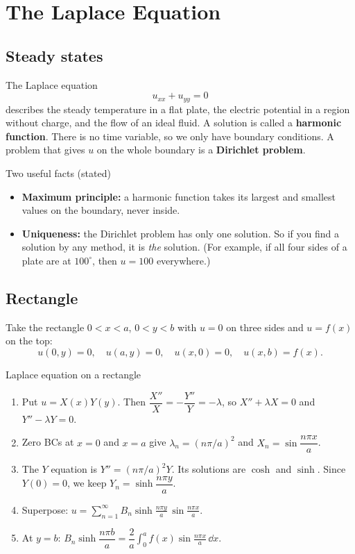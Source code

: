 \chapter{The Laplace Equation}

\section{Steady states}

The Laplace equation
\[ u_{xx} + u_{yy} = 0 \]
describes the steady temperature in a flat plate, the electric potential in a region without charge, and the flow of an ideal fluid. A solution is called a \textbf{harmonic function}. There is no time variable, so we only have boundary conditions. A problem that gives $u$ on the whole boundary is a \textbf{Dirichlet problem}.

\begin{defbox}{Two useful facts (stated)}
\begin{itemize}
  \item \textbf{Maximum principle:} a harmonic function takes its largest and smallest values on the boundary, never inside.
  \item \textbf{Uniqueness:} the Dirichlet problem has only one solution. So if you find a solution by any method, it is \emph{the} solution. (For example, if all four sides of a plate are at $100^\circ$, then $u=100$ everywhere.)
\end{itemize}
\end{defbox}

\section{Rectangle}

Take the rectangle $0<x<a$, $0<y<b$ with $u=0$ on three sides and $u=f(x)$ on the top:
\[ u(0,y) = 0,\quad u(a,y)=0,\quad u(x,0)=0,\quad u(x,b)=f(x). \]

\begin{methodbox}{Laplace equation on a rectangle}
\begin{enumerate}
  \item Put $u = X(x)Y(y)$. Then $\dfrac{X''}{X} = -\dfrac{Y''}{Y} = -\lambda$, so $X'' + \lambda X = 0$ and $Y'' - \lambda Y = 0$.
  \item Zero BCs at $x=0$ and $x=a$ give $\lambda_n = (n\pi/a)^2$ and $X_n = \sin\dfrac{n\pi x}{a}$.
  \item The $Y$ equation is $Y'' = (n\pi/a)^2Y$. Its solutions are $\cosh$ and $\sinh$. Since $Y(0)=0$, we keep $Y_n = \sinh\dfrac{n\pi y}{a}$.
  \item Superpose: $u = \displaystyle\sum_{n=1}^\infty B_n\sinh\frac{n\pi y}{a}\,\sin\frac{n\pi x}{a}$.
  \item At $y=b$: $B_n\sinh\dfrac{n\pi b}{a} = \dfrac2a\displaystyle\int_0^af(x)\sin\frac{n\pi x}{a}\,\dd x$.
\end{enumerate}
\end{methodbox}

